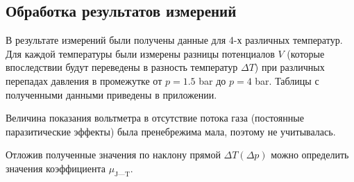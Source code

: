 \documentclass[a4paper,12pt]{report}
\begin{document}
    \newpage
    \begin{multicols}{2}
    \section{Обработка результатов измерений}
        В результате измерений были получены данные для 4-х различных температур. Для каждой температуры были измерены разницы потенциалов $V$ (которые впоследствии будут переведены в разность температур $\Delta T$) при различных перепадах давления в промежутке от $p=1.5$ bar до $p=4$ bar. Таблицы с полученными данными приведены в приложении.
        
        Величина показания вольтметра в отсутствие потока газа  (постоянные паразитические эффекты) была пренебрежима мала, поэтому не учитывалась.

        Отложив полученные значения по наклону прямой $\Delta T (\Delta p)$ можно определить значения коэффициента $\mu_{\text{J---T}}$.
    \end{multicols}
\end{document}
